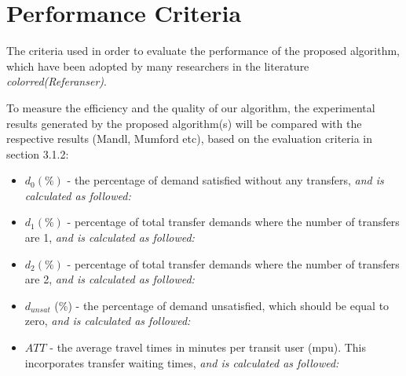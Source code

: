 \section{Performance Criteria}
\label{sec:performanceCriteria}

The criteria used in order to evaluate the performance of the proposed algorithm, which have been adopted by many researchers in the literature \emph{color{red}(Referanser)}.

To measure the efficiency and the quality of our algorithm, the experimental results generated by the proposed algorithm(s) will be compared with the respective results (Mandl, Mumford etc), based on the evaluation criteria in section 3.1.2: 

\begin{itemize}
\item $d_0 (\%)$ - the percentage of demand satisfied without any transfers, \emph{\color{red}and is calculated as followed:}
\item $d_1 (\%)$ - percentage of total transfer demands where the number of transfers are 1, \emph{\color{red}and is calculated as followed:}
\item $d_2 (\%)$ - percentage of total transfer demands where the number of transfers are 2, \emph{\color{red}and is calculated as followed:}
\item $d_{unsat}$ (\%) - the percentage of demand unsatisfied, which should be equal to zero, \emph{\color{red}and is calculated as followed:}
\item $ATT$  - the average travel times in minutes per transit user (mpu). This incorporates transfer waiting times, \emph{\color{red}and is calculated as followed:}
\end{itemize}

